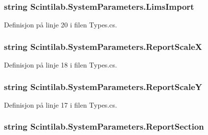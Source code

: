 \hypertarget{class_scintilab_1_1_system_parameters_a3199c40e67608d3a8d0f7854b68649c5}{
\subsubsection[{Lims\+Import}]{\setlength{\rightskip}{0pt plus 5cm}string Scintilab.\+System\+Parameters.\+Lims\+Import}}\label{class_scintilab_1_1_system_parameters_a3199c40e67608d3a8d0f7854b68649c5}


Definisjon på linje 20 i filen Types.\+cs.

\hypertarget{class_scintilab_1_1_system_parameters_aba5bbeddb5008d94218fefece754205d}{
\subsubsection[{Report\+Scale\+X}]{\setlength{\rightskip}{0pt plus 5cm}string Scintilab.\+System\+Parameters.\+Report\+Scale\+X}}\label{class_scintilab_1_1_system_parameters_aba5bbeddb5008d94218fefece754205d}


Definisjon på linje 18 i filen Types.\+cs.

\hypertarget{class_scintilab_1_1_system_parameters_a8d41eba8006654a491889e44e86a0573}{
\subsubsection[{Report\+Scale\+Y}]{\setlength{\rightskip}{0pt plus 5cm}string Scintilab.\+System\+Parameters.\+Report\+Scale\+Y}}\label{class_scintilab_1_1_system_parameters_a8d41eba8006654a491889e44e86a0573}


Definisjon på linje 17 i filen Types.\+cs.

\hypertarget{class_scintilab_1_1_system_parameters_afb477c19b940893124aeb9a0be9fc331}{
\subsubsection[{Report\+Section}]{\setlength{\rightskip}{0pt plus 5cm}string Scintilab.\+System\+Parameters.\+Report\+Section}}\label{class_scintilab_1_1_system_parameters_afb477c19b940893124aeb9a0be9fc331}


